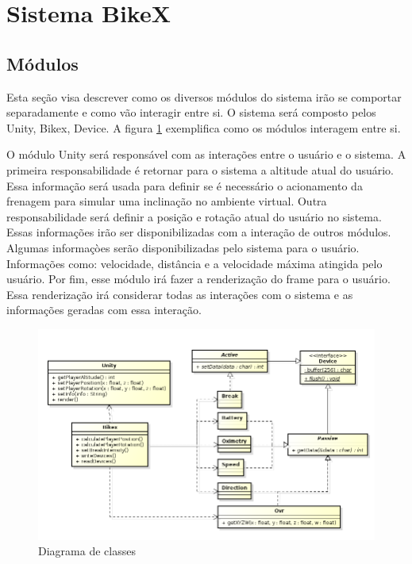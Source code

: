 \section{Sistema BikeX}
\label{sec:sistema_bikex}

\subsection{Módulos}
Esta seção visa descrever como os diversos módulos do sistema irão se comportar separadamente e como vão interagir entre si. O sistema será composto pelos Unity, Bikex, Device. A figura \ref{diagrama-classes} exemplifica como os módulos interagem entre si.

O módulo Unity será responsável com as interações entre o usuário e o sistema. A primeira responsabilidade é retornar para o sistema a altitude atual do usuário. Essa informação será usada para definir se é necessário o acionamento da frenagem para simular uma inclinação no ambiente virtual. Outra responsabilidade será definir a posição e rotação atual do usuário no sistema. Essas informações irão ser disponibilizadas com a interação de outros módulos. Algumas informaçòes serão disponibilizadas pelo sistema para o usuário. Informações como: velocidade, distância e a velocidade máxima atingida pelo usuário. Por fim, esse módulo irá fazer a renderização do frame para o usuário. Essa renderização irá considerar todas as interações com o sistema e as informações geradas com essa interação.

\begin{figure}[h]
  \centering
	\includegraphics[scale=0.5]{figuras/diagrama_de_classe}
  \caption{Diagrama de classes}
  \label{diagrama-classes}
\end{figure}

